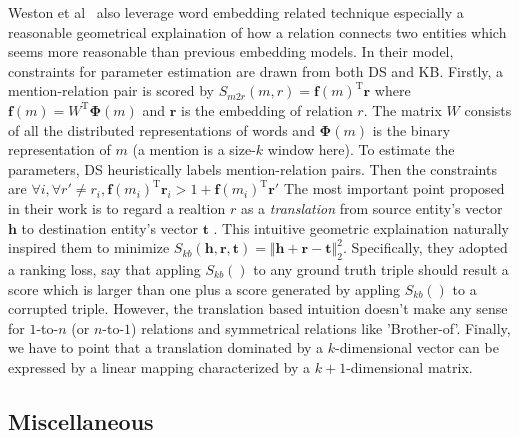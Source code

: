 \documentclass[10pt]{article} %
\theoremstyle{definition}
\theoremstyle{definition}
\begin{document}
Weston et al~\cite{embedding} also leverage word embedding related technique especially a reasonable geometrical explaination of how a relation connects two entities
which seems more reasonable than previous embedding models. 
In their model, constraints for parameter estimation are drawn from both DS and KB. 
Firstly, a mention-relation pair is scored by $S_{m2r}(m, r)=\mathbf{f}(m)^{\mathrm{T}}\mathbf{r}$ where 
$\mathbf{f}(m)=W^{\mathrm{T}}\boldsymbol{\Phi}(m)$ and $\mathbf{r}$ is the embedding of relation $r$. 
The matrix $W$ consists of all the distributed representations of words and $\boldsymbol{\Phi}(m)$ is 
the binary representation of $m$ (a mention is a size-$k$ window here). 
To estimate the parameters, DS heuristically labels mention-relation pairs. 
Then the constraints are $\forall i, \forall r'\neq r_i, \mathbf{f}(m_i)^{\mathrm{T}}\mathbf{r}_i > 1+\mathbf{f}(m_i)^{\mathrm{T}}\mathbf{r}'$
The most important point proposed in their work is to regard a realtion $r$ as a \emph{translation} from source entity's vector $\mathbf{h}$ to destination entity's vector $\mathbf{t}$ .
This intuitive geometric explaination naturally inspired them to minimize 
$S_{kb}(\mathbf{h},\mathbf{r},\mathbf{t})=\Vert \mathbf{h}+\mathbf{r}-\mathbf{t} \Vert_{2}^{2}$. 
Specifically, they adopted a ranking loss, say that appling $S_{kb}()$ to any ground truth triple should result a score 
which is larger than one plus a score generated by appling $S_{kb}()$ to a corrupted triple. 
However, the translation based intuition doesn't make any sense for $1$-to-$n$ (or $n$-to-$1$) relations and symmetrical relations like 'Brother-of'. 
Finally, we have to point that a translation dominated by a $k$-dimensional vector can be expressed by a linear mapping characterized by a $k+1$-dimensional matrix. 



\subsection{Miscellaneous}
\end{document}
